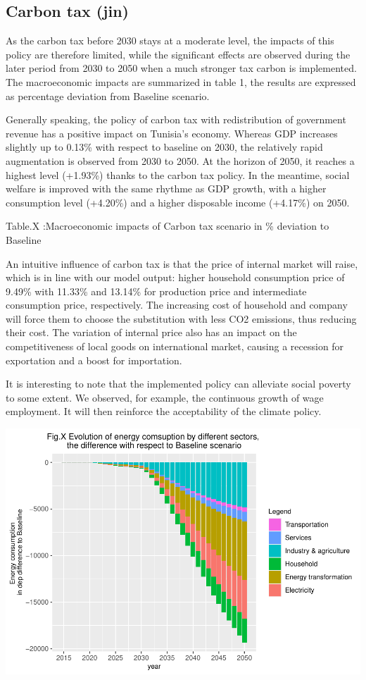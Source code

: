 \documentclass[
]{article}
\begin{document}
\hypertarget{carbon-tax-jin}{%
\subsection{Carbon tax (jin)}\label{carbon-tax-jin}}

As the carbon tax before 2030 stays at a moderate level, the impacts of
this policy are therefore limited, while the significant effects are
observed during the later period from 2030 to 2050 when a much stronger
tax carbon is implemented. The macroeconomic impacts are summarized in
table 1, the results are expressed as percentage deviation from Baseline
scenario.

Generally speaking, the policy of carbon tax with redistribution of
government revenue has a positive impact on Tunisia's economy. Whereas
GDP increases slightly up to 0.13\% with respect to baseline on 2030,
the relatively rapid augmentation is observed from 2030 to 2050. At the
horizon of 2050, it reaches a highest level (+1.93\%) thanks to the
carbon tax policy. In the meantime, social welfare is improved with the
same rhythme as GDP growth, with a higher consumption level (+4.20\%)
and a higher disposable income (+4.17\%) on 2050.

Table.X :Macroeconomic impacts of Carbon tax scenario in \% deviation to
Baseline

An intuitive influence of carbon tax is that the price of internal
market will raise, which is in line with our model output: higher
household consumption price of 9.49\% with 11.33\% and 13.14\% for
production price and intermediate consumption price, respectively. The
increasing cost of household and company will force them to choose the
substitution with less CO2 emissions, thus reducing their cost. The
variation of internal price also has an impact on the competitiveness of
local goods on international market, causing a recession for exportation
and a boost for importation.

It is interesting to note that the implemented policy can alleviate
social poverty to some extent. We observed, for example, the continuous
growth of wage employment. It will then reinforce the acceptability of
the climate policy.

\includegraphics{Modele-ThreeMe-Tunisie_Sequeira_Valilou_Wang_files/figure-latex/unnamed-chunk-20-1.pdf}
\end{document}
